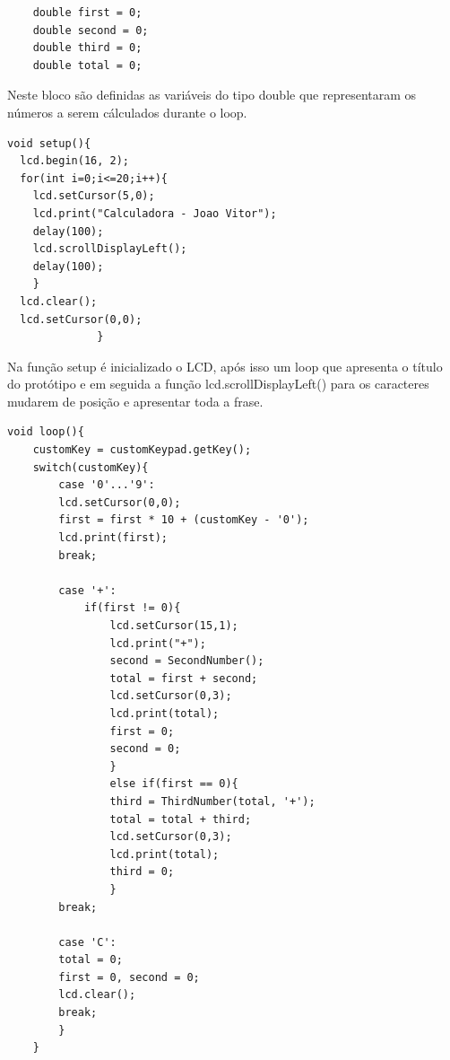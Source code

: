 \documentclass[conference]{IEEEtran}
\begin{document}
        \begin{lstlisting}
    double first = 0;
    double second = 0;
    double third = 0;
    double total = 0;
        \end{lstlisting}
        Neste bloco são definidas as variáveis do tipo double que representaram
        os números a serem cálculados durante o loop.

        \begin{lstlisting}
void setup(){
  lcd.begin(16, 2);
  for(int i=0;i<=20;i++){
    lcd.setCursor(5,0);
    lcd.print("Calculadora - Joao Vitor");
    delay(100);
    lcd.scrollDisplayLeft();
    delay(100);
  	}
  lcd.clear();
  lcd.setCursor(0,0);		
			  }
        \end{lstlisting}
        Na função setup é inicializado o LCD, após isso um loop
        que apresenta o título do protótipo e em seguida a função
        lcd.scrollDisplayLeft() para os caracteres mudarem de posição
        e apresentar toda a frase.
        
        \begin{lstlisting}
void loop(){
    customKey = customKeypad.getKey();
    switch(customKey){
        case '0'...'9':
        lcd.setCursor(0,0);
        first = first * 10 + (customKey - '0');
        lcd.print(first);
        break;
    
        case '+':
            if(first != 0){
                lcd.setCursor(15,1);
                lcd.print("+");
                second = SecondNumber();
                total = first + second;
                lcd.setCursor(0,3);
                lcd.print(total);
                first = 0;
                second = 0;
                }
                else if(first == 0){
                third = ThirdNumber(total, '+');
                total = total + third;
                lcd.setCursor(0,3);
                lcd.print(total);
                third = 0;
                }
        break;

        case 'C':
        total = 0;
        first = 0, second = 0;
        lcd.clear();
        break;
        }
    }
        \end{lstlisting}
\end{document}
